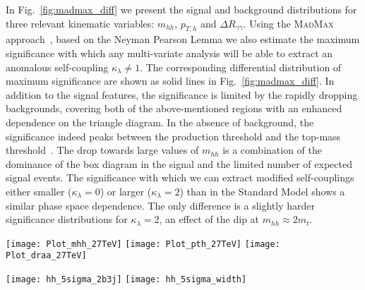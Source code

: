 In Fig.~\ref{fig:madmax_diff} we present the signal and background 
distributions for three relevant kinematic variables: $m_{hh}$, $p_{T,h}$
and $\Delta R_{\gamma\gamma}$. Using the \textsc{MadMax} 
approach~\cite{Cranmer:2006zs, Plehn:2013paa}, based on the Neyman Pearson Lemma we 
also estimate the maximum significance with which any multi-variate 
analysis will be able to extract an anomalous self-coupling 
$\kappa_\lambda \neq1$. The corresponding differential distribution of 
maximum significance are shown as solid lines in Fig.~\ref{fig:madmax_diff}. 
In addition to the signal features, the significance is limited by the rapidly dropping 
backgrounds, covering both of the above-mentioned regions with an enhanced dependence 
on the triangle diagram. In the absence of background, the significance 
indeed peaks between the production threshold and the top-mass
threshold~\cite{Kling:2016lay}.  The drop towards large values of $m_{hh}$
is a combination of the dominance of the box diagram in the signal and
the limited number of expected signal events.  The significance with
which we can extract modified self-couplings either smaller
($\kappa_\lambda = 0$) or larger ($\kappa_\lambda = 2$) than in the
Standard Model shows a similar phase space dependence. The only
difference is a slightly harder significance distributions for
$\kappa_\lambda = 2$, an effect of the dip at
$m_{hh}\approx 2m_t$.

\begin{figure*}[t]
  \texttt{[image: Plot\_mhh\_27TeV]}
  \texttt{[image: Plot\_pth\_27TeV]}
  \texttt{[image: Plot\_draa\_27TeV]}
  \caption{Kinematic distributions (dashed lines with left vertical
    axes) and significance distribution (solid lines with right
    vertical axes) assuming a Higgs self-coupling with
    $\kappa_\lambda=0,1,2$ for the HE-LHC. The significance describes the
    discrimination of an anomalous self-coupling $\kappa_\lambda \neq
    1$ from the SM hypothesis $\kappa_\lambda = 1$.}
\label{fig:madmax_diff}
\end{figure*}

\label{sec:features}

\begin{figure*}[b!]
\centering 
 \texttt{[image: hh\_5sigma\_2b3j]} 
 \texttt{[image: hh\_5sigma\_width]}
   \caption{Luminosity required for a $5\sigma$ discover of Higgs pair
     production for the HE-LHC (dashed) and a 100~TeV collider (full).
     Left: sensitivity in terms of the total rate, demanding two
     $b$-tags among the two or three leading jets and assuming
     $|m_{\gamma\gamma}-m_h|<1$~GeV.  Right: sensitivity for three
     mass windows $|m_{\gamma\gamma}-m_h|<1,2,3$~GeV.  We assume the
     SM hypothesis with $\kappa_\lambda=1$ and use a binned
     log-likelihood analysis of the $m_{hh}$ distribution.}
 \label{fig:bound1}
\end{figure*}

